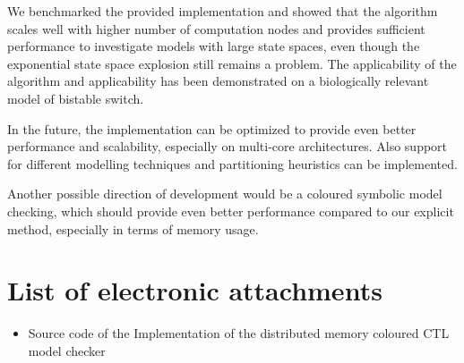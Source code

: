 \documentclass[12pt,oneside]{fithesis2}
\begin{document}
		We benchmarked the provided implementation and showed that the algorithm scales well with higher number of computation nodes and provides sufficient performance to investigate models with large state spaces, even though the exponential state space explosion still remains a problem. The applicability of the algorithm and applicability has been demonstrated on a biologically relevant model of bistable switch.
		
		In the future, the implementation can be optimized to provide even better performance and scalability, especially on multi-core architectures. Also support for different modelling techniques and partitioning heuristics can be implemented.
		
		Another possible direction of development would be a coloured symbolic model checking, which should provide even better performance compared to our explicit method, especially in terms of memory usage. 
			
					
      
		
	
    \appendix
    \chapter{List of electronic attachments}
		\begin{itemize}
			\item Source code of the Implementation of the distributed memory coloured CTL model checker
		\end{itemize}
\end{document}
